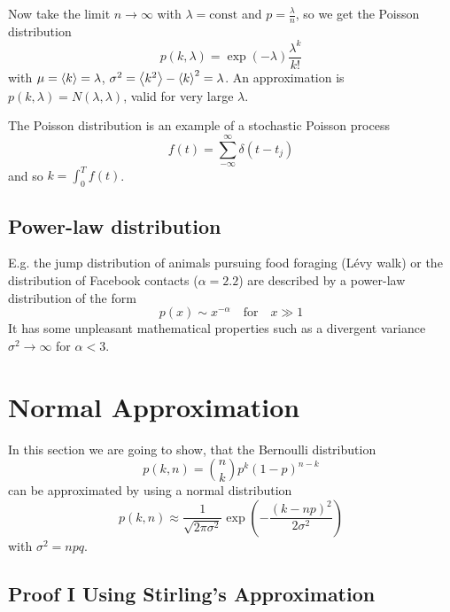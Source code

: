 \documentclass{notebook}
\begin{document}
Now take the limit $n \to \infty$ with $\lambda = \mathrm{const}$ and $p = \frac{\lambda}{n}$, so we get the Poisson distribution
%
\begin{equation}
p(k,\lambda) = \exp(-\lambda) \frac{\lambda^k}{k!}
\end{equation}
%
with $\mu = \expval{k} = \lambda$, $\sigma^2 = \expval{k^2} - \expval{k}^2 = \lambda$. An approximation is $p(k,\lambda) = N(\lambda, \lambda)$, valid for very large $\lambda$.

\begin{remark}
	The Poisson distribution is an example of a stochastic Poisson process 
	\begin{equation}
	f(t) = \sum^{\infty}_{-\infty}{\delta(t - t_j)}
	\end{equation}
	and so $k = \int^T_0{f(t)} $.	
\end{remark}

\subsection*{Power-law distribution}

E.g. the jump distribution of animals pursuing food foraging (L\'evy walk) or the distribution of Facebook contacts ($\alpha = 2.2$) are described by a power-law distribution of the form
%
\begin{equation}
p(x) \sim x^{- \alpha} \quad \mathrm{for} \quad x \gg 1
\end{equation}
%
It has some unpleasant mathematical properties such as a divergent variance $\sigma^2 \to \infty $ for $\alpha < 3$.


\newpage
\section{Normal Approximation}

In this section we are going to show, that the Bernoulli distribution 
%
\begin{equation}
p(k,n) = \binom{n}{k} p^k (1 - p)^{n - k}
\end{equation}
%
can be approximated by using a normal distribution
%
\begin{equation}
p(k,n) \approx \frac{1}{\sqrt{2 \pi \sigma^2}} \exp(-\frac{(k-np)^2}{2 \sigma^2})
\end{equation}
%
with $\sigma^2 = npq$.

\subsection*{Proof I Using Stirling's Approximation}
\end{document}
